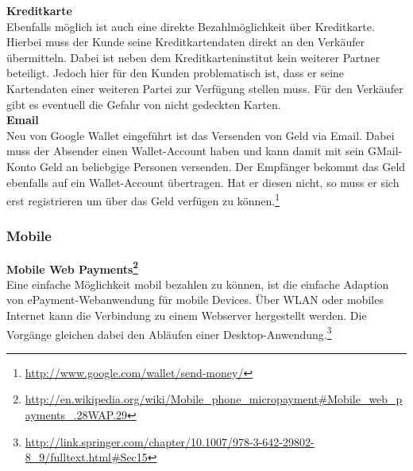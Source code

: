 \textbf{Kreditkarte}\\
Ebenfalls möglich ist auch eine direkte Bezahlmöglichkeit über Kreditkarte. Hierbei muss der Kunde seine Kreditkartendaten direkt an den Verkäufer übermitteln. Dabei ist neben dem Kreditkarteninstitut kein weiterer Partner beteiligt. Jedoch hier für den Kunden problematisch ist, dass er seine Kartendaten einer weiteren Partei zur Verfügung stellen muss. Für den Verkäufer gibt es eventuell die Gefahr von nicht gedeckten Karten.\\

\textbf{Email}\\
Neu von Google Wallet eingeführt ist das Versenden von Geld via Email. Dabei muss der Absender einen Wallet-Account haben und kann damit mit sein GMail-Konto Geld an beliebgige Personen versenden. Der Empfänger bekommt das Geld ebenfalls auf ein Wallet-Account übertragen. Hat er diesen nicht, so muss er sich erst registrieren um über das Geld verfügen zu können.\footnote{\url{http://www.google.com/wallet/send-money/}}\\

\subsubsection{Mobile}
\textbf{Mobile Web Payments\footnote{\url{http://en.wikipedia.org/wiki/Mobile_phone_micropayment\#Mobile_web_payments_.28WAP.29}}}\\
Eine einfache Möglichkeit mobil bezahlen zu können, ist die einfache Adaption von ePayment-Webanwendung für mobile Devices. Über WLAN oder mobiles Internet kann die Verbindung zu einem Webserver hergestellt werden. Die Vorgänge gleichen dabei den Abläufen einer Desktop-Anwendung.\footnote{\url{http://link.springer.com/chapter/10.1007/978-3-642-29802-8_9/fulltext.html\#Sec15}}\\

